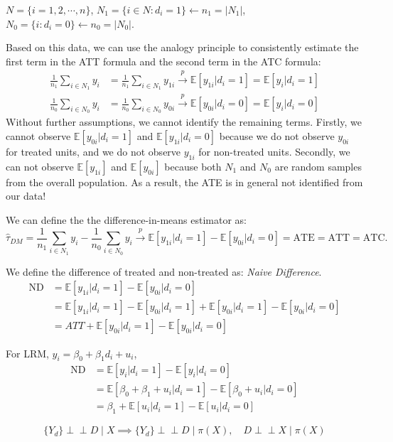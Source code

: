 $N = \{i=1,2,\cdots, n\}$, $N_1 = \{i \in N: d_i = 1\} \leftarrow n_1 = \vert N_1 \vert $, $N_0 = \{i: d_i = 0\} \leftarrow n_0 = \vert N_0 \vert $.

Based on this data, we can use the analogy principle to consistently estimate 
the first term in the ATT formula and the second term in the ATC formula:
\begin{align*}
  \frac{1}{n_1} \sum_{i \in N_1} y_i &= \frac{1}{n_1} \sum_{i \in N_1} y_{1i} \overset{p}{\rightarrow} \mathbb{E}[y_{1i} | d_i=1] = \mathbb{E}[y_i | d_i=1]\\
  \frac{1}{n_0} \sum_{i \in N_0} y_i &= \frac{1}{n_0} \sum_{i \in N_0} y_{0i} \overset{p}{\rightarrow} \mathbb{E}[y_{0i} | d_i=0] = \mathbb{E}[y_i | d_i=0]
\end{align*}
Without further assumptions, we cannot identify the remaining terms. Firstly, we cannot observe $\mathbb{E}[y_{0i} | d_i=1]$ and $\mathbb{E}[y_{1i} | d_i=0 ]$
because we do not observe $y_{0i}$ for treated units, and we do not observe $y_{1i}$ for non-treated units.
Secondly, we can not observe $\mathbb{E}[y_{1i}]$ and $\mathbb{E}[y_{0i}]$ because both $N_1$ and $N_0$ are random samples from the overall population.
As a result, the ATE is in general not identified from our data!

We can define the  the difference-in-means estimator as:
\[\hat{\tau}_{DM} = \frac{1}{n_1} \sum_{i \in N_1} y_i - \frac{1}{n_0} \sum_{i \in N_0} y_i \overset{p}{\rightarrow} \mathbb{E}[y_{1i} | d_i = 1] - \mathbb{E}[y_{0i} | d_i = 0] = \text{ATE} = \text{ATT} = \text{ATC}.\]


We define the difference of treated and non-treated as: \textit{Naive Difference}.
\begin{align*}
  \text{ND} &= \mathbb{E}[y_{1i} | d_i = 1] - \mathbb{E}[y_{0i} | d_i = 0]\\
  &= \mathbb{E}[y_{1i} | d_i = 1] - \mathbb{E}[y_{0i} | d_i = 1] + \mathbb{E}[y_{0i} | d_i =1] - \mathbb{E}[y_{0i} | d_i = 0] \\
  &= ATT + \mathbb{E}[y_{0i} | d_i = 1] - \mathbb{E}[y_{0i} | d_i = 0]
\end{align*}

For LRM, $y_i = \beta_0 + \beta_1 d_i + u_i$,
\begin{align*}
  \text{ND} &= \mathbb{E}[y_i | d_i = 1] - \mathbb{E}[y_i | d_i = 0]\\
  &= \mathbb{E}[\beta_0 + \beta_1 + u_i | d_i = 1] - \mathbb{E}[\beta_0 + u_i | d_i = 0]\\
  &= \beta_1 + \mathbb{E}[u_i | d_i = 1] - \mathbb{E}[u_i | d_i = 0]  
\end{align*}



\[
\{Y_d\} \perp\!\!\!\perp D \mid X \implies \{Y_d\} \perp\!\!\!\perp D \mid \pi(X), \quad D \perp\!\!\!\perp X \mid \pi(X)
\]